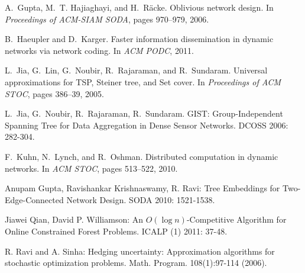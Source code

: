 \documentclass{article}
\begin{document}
{\begin{thebibliography}{99}
A.~Gupta, M.~T. Hajiaghayi, and H.~{R\"{a}cke}.
\newblock Oblivious network design.
\newblock In {\em Proceedings of ACM-SIAM SODA}, pages 970--979, 2006.

B.~Haeupler and D.~Karger.
\newblock Faster information dissemination in dynamic networks via network
  coding.
\newblock In {\em ACM PODC}, 2011.

L.~Jia, G.~Lin, G.~Noubir, R.~Rajaraman, and R.~Sundaram.
\newblock Universal approximations for TSP, Steiner tree, and Set cover.
\newblock In {\em Proceedings of ACM STOC}, pages 386--39, 2005.

L.~Jia, G.~Noubir, R.~Rajaraman, R.~Sundaram.
\newblock
GIST: Group-Independent Spanning Tree for Data Aggregation in Dense Sensor Networks. 
\newblock DCOSS 2006: 282-304.

F.~Kuhn, N.~Lynch, and R.~Oshman.
\newblock Distributed computation in dynamic networks.
\newblock In {\em ACM STOC}, pages 513--522, 2010.

 Anupam Gupta, Ravishankar Krishnaswamy, R. Ravi: Tree Embeddings for Two-Edge-Connected Network Design. SODA 2010: 1521-1538.

 Jiawei Qian, David P. Williamson: An $O(\log
  n)$-Competitive Algorithm for Online Constrained Forest
  Problems. ICALP (1) 2011: 37-48.

R. Ravi and A. Sinha:   Hedging uncertainty: Approximation
algorithms for stochastic optimization problems. Math. Program. 108(1):97-114 (2006).
\end{thebibliography}

}
\end{document}
